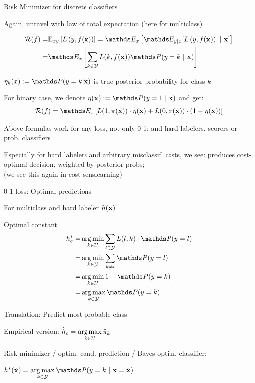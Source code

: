\documentclass[11pt,compress,t,notes=noshow, xcolor=table]{beamer}
\begin{document}
\begin{framei}[sep=M]{Risk Minimizer for discrete classifiers}

\item Again, unravel with law of total expectation (here for multiclass)

\vspace*{-0.5cm}

\begin{align*}
\riskf  = & \Exy\left[\Lxy\right] = \E_x \left[ \E_{y|x} [ \Lxy ~|~ \xv ] \right] \\
      = & \E_x \left[\sum_{k \in \Yspace} L(k, \fx) \P(y = k~|~ \xv)\right] 
\end{align*}

\item $\eta_k(x) := \P(y = k| \xv)$ is true posterior probability for class $k$

\item For binary case, we denote $\eta(\xv) := \P(y = 1 ~|~ \xv)$ and get: 
$$
\riskf = \E_x \left[L(1, \pix) \cdot \eta(\xv) + L(0, \pix) \cdot (1 - \eta(\xv)) \right]
$$

\item Above formulas work for any loss, not only 0-1; and hard labelers, scorers or prob. classifiers

\item Especially for hard labelers and arbitrary misclassif. costs, we see: produces cost-optimal decision, weighted by posterior probs; \\
(we see this again in cost-senslearning)


\end{framei}


\begin{framei}[sep=M]{0-1-loss: Optimal predictions}

\item For multiclass and hard labeler $h(\mathbf{x})$
\item Optimal constant
\begin{align*}   h_{c}^{\ast}  =& \argmin_{k \in \Yspace} \sum_{l \in \Yspace} L(l, k) \cdot \P(y = l) \\
=& \argmin_{k \in \Yspace} \sum_{k \ne l} \P(y = l) \\ 
=& \argmin_{k \in \Yspace} 1 - \P(y = k) \\
=& \argmax_{k \in \Yspace} \P(y = k)
\end{align*}


\item Translation: Predict most probable class

\item Empirical version: $\hat{h}_c = \mathop{\mathrm{arg\,max}}\limits_{k \in \mathcal{Y}} \hat{\pi}_{k}$

\item Risk minimizer / optim. cond. prediction / Bayes optim. classifier:

$h^{\ast}(\xtil) = \argmaxlim_{k \in \Yspace} \P(y = k~|~ \xv = \xtil)$ 

\end{framei}
\end{document}
